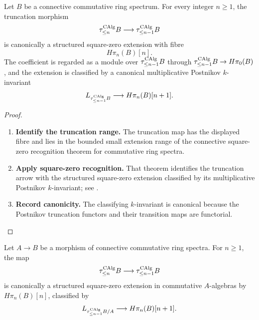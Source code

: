 \begin{theorem}
\label{thm:postnikov-square-zero-stages}
Let \(B\) be a connective commutative ring spectrum. For every integer
\(n\geq1\), the truncation morphism
\[
    \tau_{\leq n}^{\operatorname{CAlg}}B
    \longrightarrow
    \tau_{\leq n-1}^{\operatorname{CAlg}}B
\]
is canonically a structured square-zero extension with fibre
\[
    H\pi_n(B)[n].
\]
The coefficient is regarded as a module over \(\tau_{\leq n-1}^{\operatorname{CAlg}}B\) through
\(\tau_{\leq n-1}^{\operatorname{CAlg}}B\to H\pi_0(B)\), and the extension is classified by a
canonical multiplicative Postnikov \(k\)-invariant
\[
    L_{\tau_{\leq n-1}^{\operatorname{CAlg}}B}
    \longrightarrow
    H\pi_n(B)[n+1].
\]
\end{theorem}

\begin{proof}
\leavevmode
\begin{enumerate}[label=\textup{(\arabic*)}]
    \item \textbf{Identify the truncation range.}
    The truncation map has the displayed fibre and lies in the bounded small
    extension range of the connective square-zero recognition theorem for
    commutative ring spectra.
    \item \textbf{Apply square-zero recognition.}
    That theorem identifies the truncation arrow with
    the structured square-zero extension classified by its multiplicative
    Postnikov \(k\)-invariant; see
    \cite[Corollary~7.4.1.28]{LurieHigherAlgebra}.
    \item \textbf{Record canonicity.}
    The classifying \(k\)-invariant is canonical
    because the Postnikov truncation functors and their transition maps are
    functorial.
\end{enumerate}
\end{proof}

\begin{corollary}
\label{cor:relative-postnikov-square-zero}
Let \(A\to B\) be a morphism of connective commutative ring spectra. For
\(n\geq1\), the map
\[
    \tau_{\leq n}^{\operatorname{CAlg}}B
    \longrightarrow
    \tau_{\leq n-1}^{\operatorname{CAlg}}B
\]
is canonically a structured square-zero extension in commutative
\(A\)-algebras by \(H\pi_n(B)[n]\), classified by
\[
    L_{\tau_{\leq n-1}^{\operatorname{CAlg}}B/A}
    \longrightarrow
    H\pi_n(B)[n+1].
\]
\end{corollary}

